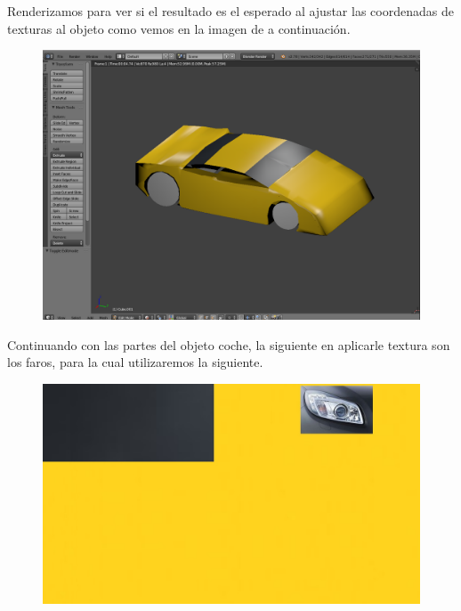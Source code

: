 \documentclass[10pt]{article}
\begin{document}
Renderizamos para ver si el resultado es el esperado al ajustar las coordenadas de texturas al objeto como vemos en la imagen de a continuación. \\

\begin{figure}[H]
	\begin{center}
	 		\includegraphics[width = 1.00\textwidth]{Imagenes/p3-img16}
	\end{center} 
\end{figure}

Continuando con las partes del objeto coche, la siguiente en aplicarle textura son los faros, para la cual utilizaremos la siguiente. \\

\begin{figure}[H]
	\begin{center}
	 		\includegraphics[width = 1.00\textwidth]{Imagenes/p3-img17}
	\end{center} 
\end{figure}
\end{document}
